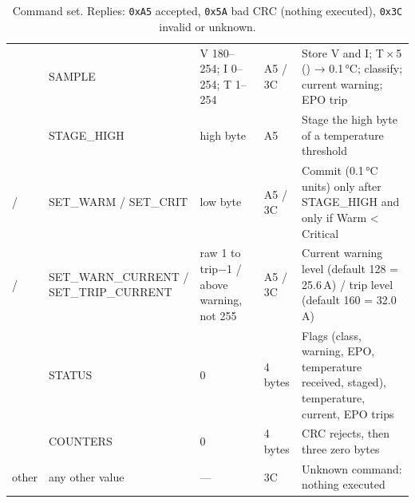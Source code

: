 \begin{table}[H]
\caption[Command set]{Command set. Replies: \texttt{0xA5} accepted, \texttt{0x5A} bad CRC (nothing executed), \texttt{0x3C} invalid or unknown.}
\label{tab:commands}
{\tablestyle
\begin{tabularx}{\linewidth}{@{}P{15mm}P{35mm}P{37mm}P{14mm}L@{}}
\toprule
{} &  &  &  & \\
\midrule
{} & SAMPLE & V 180–254; I 0–254; T 1–254 & A5 / 3C & Store V and I; T\,×\,5 () → 0.1\,°C; classify; current warning; EPO trip\\
 & STAGE\_HIGH & high byte & A5 & Stage the high byte of a temperature threshold\\
 /  & SET\_WARM / SET\_CRIT & low byte & A5 / 3C & Commit (0.1\,°C units) only after STAGE\_HIGH and only if Warm < Critical\\
 /  & SET\_WARN\_CURRENT / SET\_TRIP\_CURRENT & raw 1 to trip$-$1 / above warning, not 255 & A5 / 3C & Current warning level (default 128 = 25.6\,A) / trip level (default 160 = 32.0\,A)\\
 & STATUS & 0 & 4 bytes & Flags (class, warning, EPO, temperature received, staged), temperature, current, EPO trips\\
 & COUNTERS & 0 & 4 bytes & CRC rejects, then three zero bytes\\
other & any other value & — & 3C & Unknown command: nothing executed\\
\bottomrule
\end{tabularx}}
\end{table}
